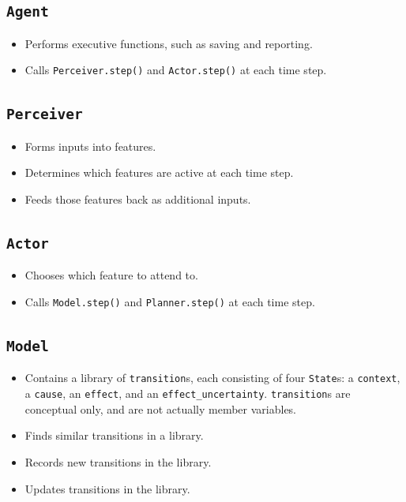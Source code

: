 \subsection{\texttt{Agent}}
\begin{itemize}
\item Performs executive functions, such as saving and reporting.
\item Calls \texttt{Perceiver.step()} and  \texttt{Actor.step()} at each time step.
\end{itemize}

\subsection{\texttt{Perceiver}}
\begin{itemize}
\item Forms inputs into features.
\item Determines which features are active at each time step.
\item Feeds those features back as additional inputs.
\end{itemize}

\subsection{\texttt{Actor}}
\begin{itemize}
\item Chooses which feature to attend to.
\item Calls \texttt{Model.step()} and  \texttt{Planner.step()} at each time step.
\end{itemize}

\subsection{\texttt{Model}}
\begin{itemize}
\item Contains a library of \texttt{transition}s, each consisting of four \texttt{State}s: a \texttt{context}, a \texttt{cause}, an \texttt{effect}, and an \texttt{effect\_uncertainty}. \texttt{transition}s are conceptual only, and are not actually member variables.
\item Finds similar transitions in a library.
\item Records new transitions in the library.
\item Updates transitions in the library.
\end{itemize}

